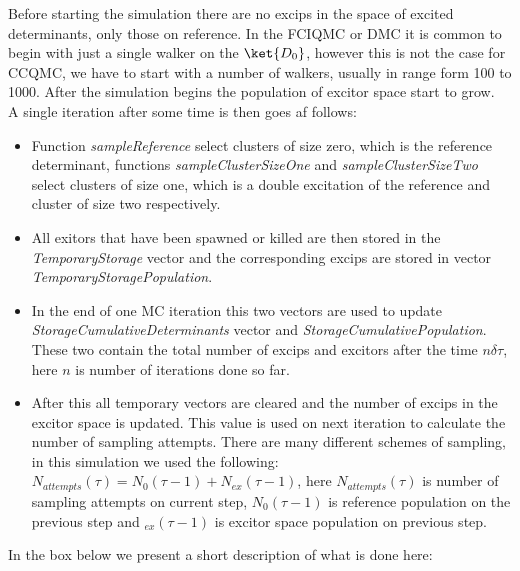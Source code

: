 Before starting the simulation there are no excips in the space of excited determinants, only those on reference. In the FCIQMC or DMC it is common to begin with just a single walker on the $\ket{D_0}$, however this is not the case for CCQMC, we have to start with a number of walkers, usually in range form 100 to 1000. After the simulation begins the population of excitor space start to grow. \\ 

A single iteration after some time is then goes af follows:
\begin{itemize}
\item Function \textit{sampleReference} select clusters of size zero, which is the reference determinant, functions \textit{sampleClusterSizeOne} and \textit{sampleClusterSizeTwo} select clusters of size one, which is a double excitation of the reference and cluster of size two respectively. 
\item All exitors that have been spawned or killed are then stored in the \textit{TemporaryStorage} vector and the corresponding excips are stored in vector \textit{TemporaryStoragePopulation}.
\item In the end of one MC iteration this two vectors are used to update \textit{StorageCumulativeDeterminants} vector and \textit{StorageCumulativePopulation}. These two contain the total number of excips and excitors after the time $n \delta\tau$, here $n$ is number of iterations done so far. 
\item After this all temporary vectors are cleared and the number of excips in the excitor space is updated. This value is used on next iteration to calculate the number of sampling attempts. There are many different schemes of sampling, in this simulation we used the following: $N_{attempts}(\tau)= N_0(\tau-1)+N_{ex}(\tau-1)$, here $N_{attempts}(\tau)$ is number of sampling attempts on current step, $N_0(\tau-1)$ is reference population on the previous step and $_{ex}(\tau-1)$ is excitor space population on previous step.
\end{itemize}
In the box below we present a short description of what is done here:

